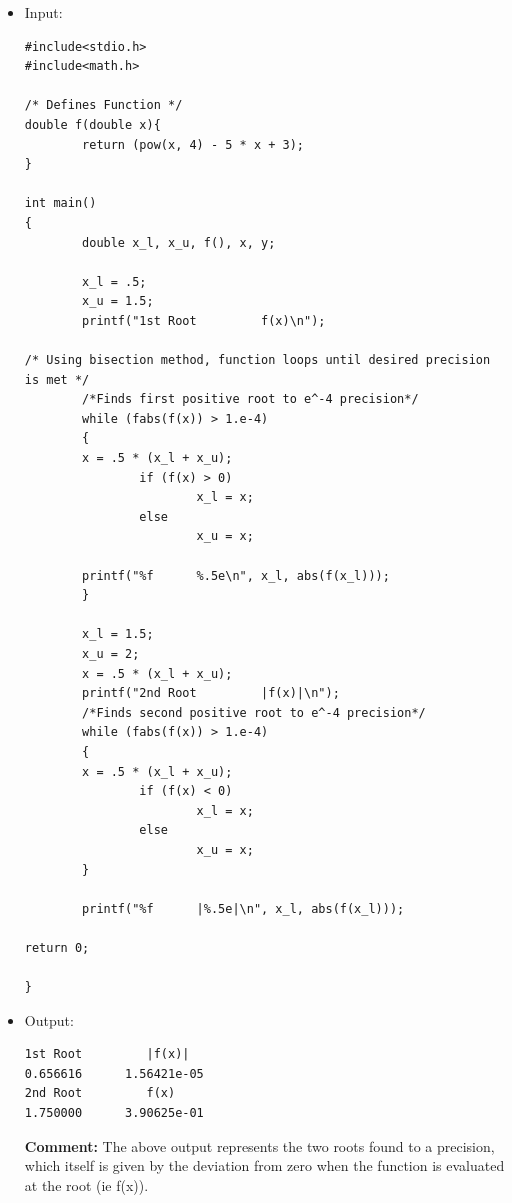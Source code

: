 \documentclass[10pt]{article}
\begin{document}
\begin{itemize}
\item Input:
\begin{verbatim}
#include<stdio.h>
#include<math.h>

/* Defines Function */
double f(double x){
        return (pow(x, 4) - 5 * x + 3);
}

int main()
{
        double x_l, x_u, f(), x, y;

        x_l = .5;
        x_u = 1.5;
        printf("1st Root         f(x)\n");

/* Using bisection method, function loops until desired precision is met */
        /*Finds first positive root to e^-4 precision*/
        while (fabs(f(x)) > 1.e-4)
        {
        x = .5 * (x_l + x_u);
                if (f(x) > 0)
                        x_l = x;
                else
                        x_u = x;

        printf("%f      %.5e\n", x_l, abs(f(x_l)));
        }

        x_l = 1.5;
        x_u = 2;
        x = .5 * (x_l + x_u);
        printf("2nd Root         |f(x)|\n");
        /*Finds second positive root to e^-4 precision*/
        while (fabs(f(x)) > 1.e-4)
        {
        x = .5 * (x_l + x_u);
                if (f(x) < 0)
                        x_l = x;
                else
                        x_u = x;
        }

        printf("%f      |%.5e|\n", x_l, abs(f(x_l)));

return 0;

}
\end{verbatim}
\item Output:
\begin{verbatim}
1st Root         |f(x)|
0.656616      1.56421e-05
2nd Root         f(x)
1.750000      3.90625e-01

\end{verbatim}
\textbf{Comment:} The above output represents the two roots found to a precision, which itself is given by the deviation from zero when the function is evaluated at the root (ie f(x)).

\end{itemize}
\end{document}
